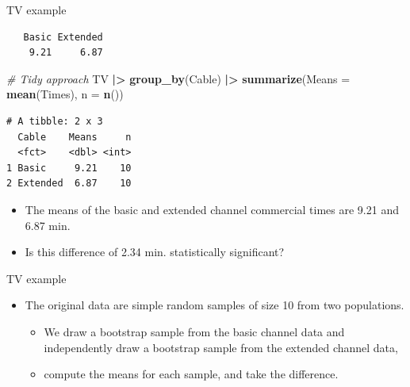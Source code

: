 \documentclass[
  ignorenonframetext,
]{beamer}
\newenvironment{Shaded}{\begin{snugshade}}{\end{snugshade}}
\newcommand{\AttributeTok}[1]{\textcolor[rgb]{0.13,0.29,0.53}{#1}}
\newcommand{\CommentTok}[1]{\textcolor[rgb]{0.56,0.35,0.01}{\textit{#1}}}
\newcommand{\FunctionTok}[1]{\textcolor[rgb]{0.13,0.29,0.53}{\textbf{#1}}}
\newcommand{\NormalTok}[1]{#1}
\newcommand{\OtherTok}[1]{\textcolor[rgb]{0.56,0.35,0.01}{#1}}
\newcommand{\SpecialCharTok}[1]{\textcolor[rgb]{0.81,0.36,0.00}{\textbf{#1}}}
\providecommand{\tightlist}{%
  \setlength{\itemsep}{0pt}\setlength{\parskip}{0pt}}
\begin{document}
\begin{frame}[fragile]{TV example}
\protect\hypertarget{tv-example-1}{}
\small

\begin{Shaded}
\end{Shaded}

\begin{verbatim}
   Basic Extended 
    9.21     6.87 
\end{verbatim}

\begin{Shaded}
\begin{Highlighting}[]
\CommentTok{\# Tidy approach}
\NormalTok{TV }\SpecialCharTok{|\textgreater{}}
  \FunctionTok{group\_by}\NormalTok{(Cable) }\SpecialCharTok{|\textgreater{}}
  \FunctionTok{summarize}\NormalTok{(}\AttributeTok{Means =} \FunctionTok{mean}\NormalTok{(Times), }\AttributeTok{n =} \FunctionTok{n}\NormalTok{())}
\end{Highlighting}
\end{Shaded}

\begin{verbatim}
# A tibble: 2 x 3
  Cable    Means     n
  <fct>    <dbl> <int>
1 Basic     9.21    10
2 Extended  6.87    10
\end{verbatim}

\normalsize

\begin{itemize}
\item
  The means of the basic and extended channel commercial times are 9.21
  and 6.87 min.
\item
  Is this difference of 2.34 min. statistically significant?
\end{itemize}
\end{frame}

\begin{frame}{TV example}
\protect\hypertarget{tv-example-2}{}
\begin{itemize}
\item
  The original data are simple random samples of size 10 from two
  populations.

  \begin{itemize}
  \tightlist
  \item
    We draw a bootstrap sample from the basic channel data and
    independently draw a bootstrap sample from the extended channel
    data,
  \item
    compute the means for each sample, and take the difference.
  \end{itemize}
\end{itemize}
\end{frame}
\end{document}
